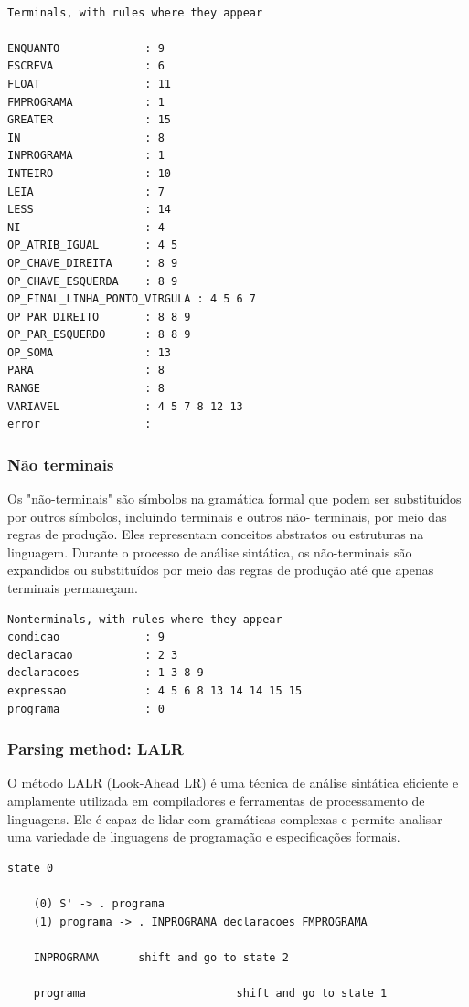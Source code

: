 \documentclass[a4paper,12pt]{article}
\begin{document}
\begin{verbatim}    

Terminals, with rules where they appear

ENQUANTO             : 9
ESCREVA              : 6
FLOAT                : 11
FMPROGRAMA           : 1
GREATER              : 15
IN                   : 8
INPROGRAMA           : 1
INTEIRO              : 10
LEIA                 : 7
LESS                 : 14
NI                   : 4
OP_ATRIB_IGUAL       : 4 5
OP_CHAVE_DIREITA     : 8 9
OP_CHAVE_ESQUERDA    : 8 9
OP_FINAL_LINHA_PONTO_VIRGULA : 4 5 6 7
OP_PAR_DIREITO       : 8 8 9
OP_PAR_ESQUERDO      : 8 8 9
OP_SOMA              : 13
PARA                 : 8
RANGE                : 8
VARIAVEL             : 4 5 7 8 12 13
error                : 

\end{verbatim}

\subsubsection{Não terminais}
Os "não-terminais" são símbolos na gramática formal que podem ser 
substituídos por outros símbolos, incluindo terminais e outros não-
terminais, por meio das regras de produção. Eles representam conceitos 
abstratos ou estruturas na linguagem. Durante o processo de análise 
sintática, os não-terminais são expandidos ou substituídos por meio das 
regras de produção até que apenas terminais permaneçam.

\begin{verbatim} 
Nonterminals, with rules where they appear
condicao             : 9
declaracao           : 2 3
declaracoes          : 1 3 8 9
expressao            : 4 5 6 8 13 14 14 15 15
programa             : 0

\end{verbatim}

\subsubsection{Parsing method: LALR}
O método LALR (Look-Ahead LR) é uma técnica de análise sintática eficiente e amplamente utilizada 
em compiladores e ferramentas de processamento de linguagens. Ele é capaz de lidar com gramáticas 
complexas e permite analisar uma variedade de linguagens de programação e especificações formais.

\begin{verbatim} 
state 0

    (0) S' -> . programa
    (1) programa -> . INPROGRAMA declaracoes FMPROGRAMA

    INPROGRAMA      shift and go to state 2

    programa                       shift and go to state 1
    
\end{verbatim}
\end{document}
